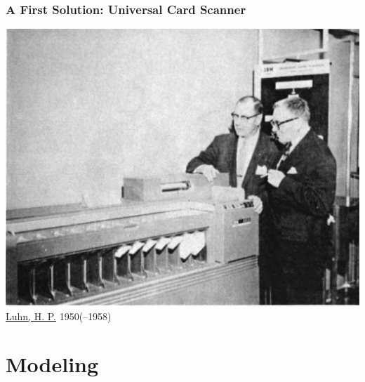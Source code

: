 \documentclass[svgnames]{beamer}
\begin{document}
\begin{frame}
    \frametitle{A First Solution: Universal Card Scanner }

    \begin{center}
        \includegraphics[width=.8\linewidth]{luhn}\\
        \raggedleft \footnotesize \href{http://onlinebooks.library.upenn.edu/webbin/book/lookupname?key=Luhn\%2C\%20H\%2E\%20P\%2E\%20\%28Hans\%20Peter\%29\%2C\%201896\%2D1964}{Luhn, H. P.} 1950(--1958)
    \end{center}

\end{frame}


\section{Modeling}
\label{sec:modeling}

\newcommand{\ff}[1]{\visible<3-4>{\textcolor{Red}{#1}}}
\newcommand{\sw}[1]{\uncover<-3>{#1}}
\newcommand{\pl}{\hline\hline}
\newcommand{\vl}{\hfill\vline}
\end{document}
